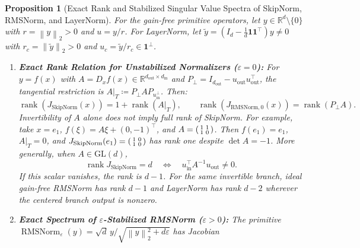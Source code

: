 \documentclass[10pt]{article}
\newtheorem{proposition}{Proposition}
\theoremstyle{definition}
\theoremstyle{remark}
\newcommand{\R}{\mathbb{R}}
\newcommand{\norm}[1]{\left\lVert #1 \right\rVert}
\DeclareMathOperator{\rank}{rank}
\begin{document}
\begin{proposition}[Exact Rank and Stabilized Singular Value Spectra of SkipNorm, RMSNorm, and LayerNorm]
\label{prop:stabilized_spectra}
For the gain-free primitive operators, let $y \in \R^d \setminus \{0\}$ with $r = \norm{y}_2 > 0$ and $u = y / r$. For LayerNorm, let $\tilde{y} = (I_d - \frac{1}{d}\mathbf{1}\mathbf{1}^\top)y \neq 0$ with $r_c = \norm{\tilde{y}}_2 > 0$ and $u_c = \tilde{y}/r_c \in \mathbf{1}^\perp$.
\begin{enumerate}
    \item[\textbf{(a)}] \textbf{Exact Rank Relation for Unstabilized Normalizers ($\varepsilon = 0$):} For $y = f(x)$ with $A = D_x f(x) \in \R^{d_{\mathrm{out}} \times d_{\mathrm{in}}}$ and $P_\perp = I_{d_{\mathrm{out}}} - u_{\mathrm{out}} u_{\mathrm{out}}^\top$, the tangential restriction is $A|_T \coloneqq P_\perp A P_{u_{\mathrm{in}}^\perp}$. Then:
    \begin{equation}
        \rank(J_{\mathrm{SkipNorm}}(x)) = 1 + \rank(A|_T), \qquad \rank(J_{\mathrm{RMSNorm}, 0}(x)) = \rank(P_\perp A).
        \label{eq:rank_identities}
    \end{equation}
    Invertibility of $A$ alone does not imply full rank of SkipNorm. For example, take $x=e_1$, $f(\xi)=A\xi+(0,-1)^\top$, and $A=\begin{psmallmatrix}1&1\\1&0\end{psmallmatrix}$. Then $f(e_1)=e_1$, $A|_T=0$, and $J_{\mathrm{SkipNorm}}(e_1)=\begin{psmallmatrix}1&0\\1&0\end{psmallmatrix}$ has rank one despite $\det A=-1$. More generally, when $A\in\mathrm{GL}(d)$,
    \begin{equation}
        \rank J_{\mathrm{SkipNorm}}=d
        \quad\Longleftrightarrow\quad
        u_{\mathrm{in}}^\top A^{-1}u_{\mathrm{out}}\ne0.
        \label{eq:full_rank_condition}
    \end{equation}
    If this scalar vanishes, the rank is $d-1$. For the same invertible branch, ideal gain-free RMSNorm has rank $d-1$ and LayerNorm has rank $d-2$ wherever the centered branch output is nonzero.
    \item[\textbf{(b)}] \textbf{Exact Spectrum of $\varepsilon$-Stabilized RMSNorm ($\varepsilon > 0$):} The primitive $\operatorname{RMSNorm}_\varepsilon(y) = \sqrt{d} \, y / \sqrt{\norm{y}_2^2 + d\varepsilon}$ has Jacobian
    \begin{equation}

\end{equation}
\end{enumerate}
\end{proposition}
\end{document}
